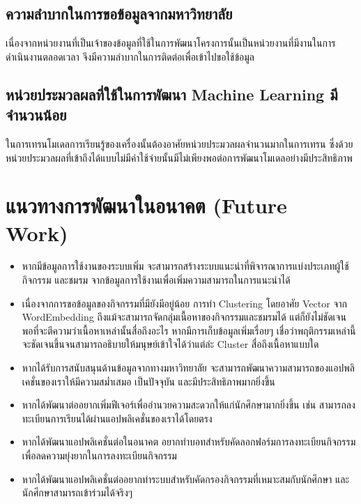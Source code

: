 \documentclass[14pt,oneside,openright,a4paper]{cpe-thai-project}
\begin{document}
\subsection{ความลำบากในการขอข้อมูลจากมหาวิทยาลัย}
เนื่องจากหน่วยงานที่เป็นเจ้าของข้อมูลที่ใช้ในการพัฒนาโครงการนั้นเป็นหน่วยงานที่มีงานในการดำเนินงานตลอดเวลา จึงมีความลำบากในการติดต่อเพื่อเข้าไปขอใช้ข้อมูล

\subsection{หน่วยประมวลผลที่ใช้ในการพัฒนา Machine Learning มีจำนวนน้อย}
ในการเทรนโมเดลการเรียนรู้ของเครื่องนั้นต้องอาศัยหน่วยประมวลผลจำนวนมากในการเทรน ซึ่งด้วยหน่วยประมวลผลที่เข้าถึงได้แบบไม่มีค่าใช้จ่ายนั้นมีไม่เพียงพอต่อการพัฒนาโมเดลอย่างมีประสิทธิภาพ

\section{แนวทางการพัฒนาในอนาคต (Future Work)}
\begin{itemize}
  \item หากมีข้อมูลการใช้งานของระบบเพิ่ม จะสามารถสร้างระบบแนะนำที่พิจารณาการแบ่งประเภทผู้ใช้ กิจกรรม และชมรม จากข้อมูลการใช้งานเพื่อเพิ่มความสามารถในการแนะนำได้
  \item เนื่องจากการขอข้อมูลของกิจกรรมที่มียังมีอยู่น้อย การทำ Clustering โดยอาศัย Vector จาก WordEmbedding ถึงแม้จะสามารถจัดกลุ่มเนื้อหาของกิจกรรมและชมรมได้ แต่ก็ยังไม่ชัดเจนพอที่จะตีความว่าเนื้อหาเหล่านั้นสื่อถึงอะไร หากมีการเก็บข้อมูลเพิ่มเรื่อยๆ เชื่อว่าพฤติกรรมเหล่านี้จะชัดเจนขึ้นจนสามารถอธิบายให้มนุษย์เข้าใจได้ว่าแต่ล่ะ Cluster สื่อถึงเนื้อหาแบบใด
  \item หากได้รับการสนับสนุนด้านข้อมูลจากทางมหาวิทยาลัย จะสามารถพัฒนาความสามารถของแอปพลิเคชั่นของเราให้มีความสม่ำเสมอ เป็นปัจจุบัน และมีประสิทธิภาพมากยิ่งขึ้น
  \item หากได้พัฒนาต่ออยากเพิ่มฟีเจอร์เพื่ออำนวยความสะดวกให้แก่นักศึกษามากยิ่งขึ้น เช่น สามารถลงทะเบียนการเรียนได้ผ่านแอปพลิเคชั่นของเราได้โดยตรง
  \item หากได้พัฒนาแอปพลิเคชั่นต่อในอนาคต อยากทำบอทสำหรับคัดลอกฟอร์มการลงทะเบียนกิจกรรม เพื่อลดความยุ่งยากในการลงทะเบียนกิจกรรม
  \item หากได้พัฒนาแอปพลิเคชั่นต่ออยากทำระบบสำหรับคัดกรองกิจกรรมที่เหมาะสมกับนักศึกษา และนักศึกษาสามารถเข้าร่วมได้จริงๆ
\end{itemize}

\makeatletter
\g@addto@macro{\UrlBreaks}{\UrlOrds}
\makeatother
\end{document}
